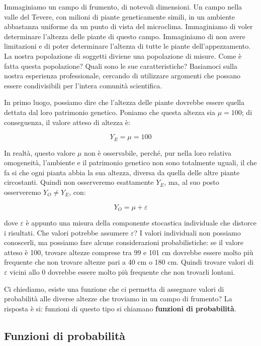 \documentclass[a4paper,12pt,oneside]{book}
\begin{document}
Immaginiamo un campo di frumento, di notevoli dimensioni. Un campo nella valle del Tevere, con milioni di piante geneticamente simili, in un ambiente abbastanza uniforme da un punto di vista del microclima. Immaginiamo di voler determinare l'altezza delle piante di questo campo. Immaginiamo di non avere limitazioni e di poter determinare l'altezza di tutte le piante dell'appezzamento. La nostra popolazione di soggetti diviene una popolazione di misure. Come è fatta questa popolazione? Quali sono le sue caratteristiche? Basiamoci sulla nostra esperienza professionale, cercando di utilizzare argomenti che possano essere condivisibili per l'intera comunità scientifica.

In primo luogo, possiamo dire che l'altezza delle piante dovrebbe essere quella dettata dal loro patrimonio genetico. Poniamo che questa altezza sia \(\mu = 100\); di conseguenza, il valore atteso di altezza è:

\[Y_E  = \mu = 100\]

In realtà, questo valore \(\mu\) non è osservabile, perché, pur nella loro relativa omogeneità, l'ambiente e il patrimonio genetico non sono totalmente uguali, il che fa si che ogni pianta abbia la sua altezza, diversa da quella delle altre piante circostanti. Quindi non osserveremo esattamente \(Y_E\), ma, al suo posto osserveremo \(Y_O \neq Y_E\), con:

\[ Y_O = \mu + \varepsilon \]

dove \(\varepsilon\) è appunto una misura della componente stocastica individuale che distorce i risultati. Che valori potrebbe assumere \(\varepsilon\)? I valori individuali non possiamo conoscerli, ma possiamo fare alcune considerazioni probabilistiche: se il valore atteso è 100, trovare altezze comprese tra 99 e 101 cm dovrebbe essere molto più frequente che non trovare altezze pari a 40 cm o 180 cm. Quindi trovare valori di \(\varepsilon\) vicini allo 0 dovrebbe essere molto più frequente che non trovarli lontani.

Ci chiediamo, esiste una funzione che ci permetta di assegnare valori di probabilità alle diverse altezze che troviamo in un campo di frumento? La risposta è si: funzioni di questo tipo si chiamano \textbf{funzioni di probabilità}.

\hypertarget{funzioni-di-probabilita}{%
\subsection{Funzioni di probabilità}\label{funzioni-di-probabilita}}
\end{document}
